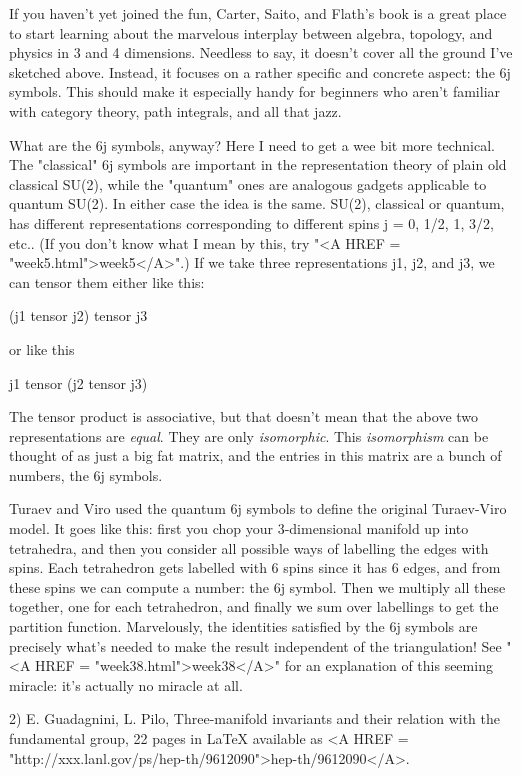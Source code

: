 If you haven't yet joined the fun, Carter, Saito, and Flath's book is a 
great place to start learning about the marvelous interplay between 
algebra, topology, and physics in 3 and 4 dimensions.  Needless to say, 
it doesn't cover all the ground I've sketched above.  Instead, it focuses 
on a rather specific and concrete aspect: the 6j symbols.  This should
make it especially handy for beginners who aren't familiar with category
theory, path integrals, and all that jazz.  


 What are the 6j symbols, anyway?  Here I need to get a wee bit
more technical.  The "classical" 6j symbols are important in
the representation theory of plain old classical SU(2), while the
"quantum" ones are analogous gadgets applicable to quantum
SU(2).  In either case the idea is the same.  SU(2), classical or
quantum, has different representations corresponding to different
spins j = 0, 1/2, 1, 3/2, etc..  (If you don't know what I mean by
this, try "<A HREF = "week5.html">week5</A>".)  If we take
three representations j1, j2, and j3, we can tensor them either like
this:

(j1 tensor j2) tensor j3

or like this

j1 tensor (j2 tensor j3)

The tensor product is associative, but that doesn't mean that the
above two representations are \emph{equal}.  They are only \emph{isomorphic}.
This \emph{isomorphism} can be thought of as just a big fat matrix, and
the entries in this matrix are a bunch of numbers, the 6j symbols.  

Turaev and Viro used the quantum 6j symbols to define the original 
Turaev-Viro model.   It goes like this: first you chop your 3-dimensional
manifold up into tetrahedra, and then you consider all possible ways
of labelling the edges with spins.  Each tetrahedron gets labelled with
6 spins since it has 6 edges, and from these spins we can compute a 
number: the 6j symbol.  Then we multiply all these together, one for each 
tetrahedron, and finally we sum over labellings to get the partition function.
Marvelously, the identities satisfied by the 6j symbols are precisely what's 
needed to make the result independent of the triangulation!  See "<A HREF = "week38.html">week38</A>" for
an explanation of this seeming miracle: it's actually no miracle at all.

2) E. Guadagnini, L. Pilo, Three-manifold invariants and their relation 
with the fundamental group, 22 pages in LaTeX available as <A HREF = "http://xxx.lanl.gov/ps/hep-th/9612090">hep-th/9612090</A>.

